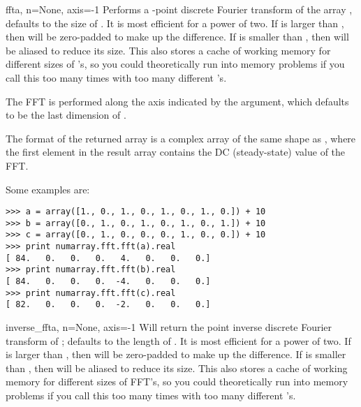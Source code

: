 \begin{funcdesc}{fft}{a, n=None, axis=-1} 
   Performs a -point discrete Fourier transform of the array 
   ,  defaults to the size of . It is 
   most efficient for  a power of two. If  is 
   larger than , then  will be
   zero-padded to make up the difference. If  is smaller than
   , then  will be aliased to reduce its size. This
   also stores a cache of working memory for different sizes of 
   's, so you could theoretically run into memory problems if 
   you call this too many times with too many different 's.
   
   The FFT is performed along the axis indicated by the  
   argument, which defaults to be the last dimension of .
   
   The format of the returned array is a complex array of the same shape as
   , where the first element in the result array contains the DC
   (steady-state) value of the FFT.

   Some examples are:
\begin{verbatim}
>>> a = array([1., 0., 1., 0., 1., 0., 1., 0.]) + 10
>>> b = array([0., 1., 0., 1., 0., 1., 0., 1.]) + 10
>>> c = array([0., 1., 0., 0., 0., 1., 0., 0.]) + 10
>>> print numarray.fft.fft(a).real
[ 84.   0.   0.   0.   4.   0.   0.   0.]
>>> print numarray.fft.fft(b).real
[ 84.   0.   0.   0.  -4.   0.   0.   0.]
>>> print numarray.fft.fft(c).real
[ 82.   0.   0.   0.  -2.   0.   0.   0.]
\end{verbatim}
\end{funcdesc}
       
\begin{funcdesc}{inverse_fft}{a, n=None, axis=-1}
   Will return the  point inverse discrete Fourier transform of
   ;  defaults to the length of . 
   It is most efficient for  a power of two.  If  
   is larger than , then  will be zero-padded to 
   make up the difference.  If  is smaller than , 
   then  will be aliased to reduce its size.
   This also stores a cache of working memory for different sizes of FFT's, so
   you could theoretically run into memory problems if you call this too many
   times with too many different 's.
\end{funcdesc}
       
